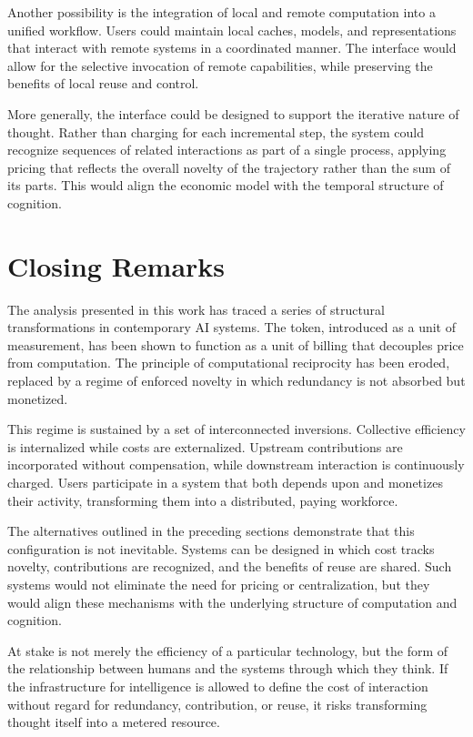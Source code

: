 \documentclass[12pt, oneside]{article}
\begin{document}
Another possibility is the integration of local and remote computation into a unified workflow. Users could maintain local caches, models, and representations that interact with remote systems in a coordinated manner. The interface would allow for the selective invocation of remote capabilities, while preserving the benefits of local reuse and control.

More generally, the interface could be designed to support the iterative nature of thought. Rather than charging for each incremental step, the system could recognize sequences of related interactions as part of a single process, applying pricing that reflects the overall novelty of the trajectory rather than the sum of its parts. This would align the economic model with the temporal structure of cognition.

\section{Closing Remarks}

The analysis presented in this work has traced a series of structural transformations in contemporary AI systems. The token, introduced as a unit of measurement, has been shown to function as a unit of billing that decouples price from computation. The principle of computational reciprocity has been eroded, replaced by a regime of enforced novelty in which redundancy is not absorbed but monetized.

This regime is sustained by a set of interconnected inversions. Collective efficiency is internalized while costs are externalized. Upstream contributions are incorporated without compensation, while downstream interaction is continuously charged. Users participate in a system that both depends upon and monetizes their activity, transforming them into a distributed, paying workforce.

The alternatives outlined in the preceding sections demonstrate that this configuration is not inevitable. Systems can be designed in which cost tracks novelty, contributions are recognized, and the benefits of reuse are shared. Such systems would not eliminate the need for pricing or centralization, but they would align these mechanisms with the underlying structure of computation and cognition.

At stake is not merely the efficiency of a particular technology, but the form of the relationship between humans and the systems through which they think. If the infrastructure for intelligence is allowed to define the cost of interaction without regard for redundancy, contribution, or reuse, it risks transforming thought itself into a metered resource.
\end{document}
